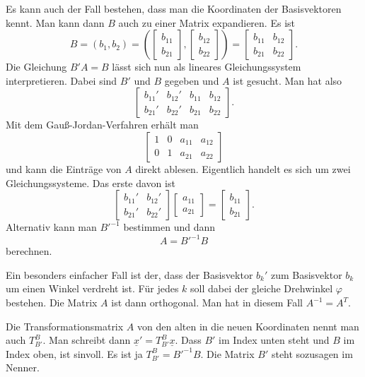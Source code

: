 \documentclass[a4paper,10pt,fleqn,twocolumn,twoside]{article}
\begin{document}
Es kann auch der Fall bestehen, dass man die Koordinaten der
Basisvektoren kennt. Man kann dann \(B\) auch zu einer Matrix
expandieren. Es ist
\[B = (b_1,b_2)
= (\begin{bmatrix}b_{11}\\ b_{21}\end{bmatrix},
\begin{bmatrix}b_{12}\\ b_{22}\end{bmatrix})
= \begin{bmatrix}
b_{11} & b_{12}\\
b_{21} & b_{22}
\end{bmatrix}.\]
Die Gleichung \(B'A=B\) lässt sich nun als lineares Gleichungssystem
interpretieren. Dabei sind \(B'\) und \(B\) gegeben und \(A\) ist
gesucht. Man hat also
\[\left[\begin{array}{cc|cc}
b_{11}' & b_{12}' & b_{11} & b_{12}\\
b_{21}' & b_{22}' & b_{21} & b_{22}
\end{array}\right].\]
Mit dem Gauß-Jordan-Verfahren erhält man
\[\left[\begin{array}{cc|cc}
1 & 0 & a_{11} & a_{12}\\
0 & 1 & a_{21} & a_{22}
\end{array}\right]\]
und kann die Einträge von \(A\) direkt ablesen.
Eigentlich handelt es sich um zwei Gleichungssysteme.
Das erste davon ist
\[\begin{bmatrix}
b_{11}' & b_{12}'\\
b_{21}' & b_{22}'
\end{bmatrix}
\begin{bmatrix}
a_{11}\\ a_{21}
\end{bmatrix}
= \begin{bmatrix}
b_{11}\\ b_{21}
\end{bmatrix}.\]
Alternativ kann man \(B'^{-1}\) bestimmen und dann
\[A = B'^{-1}B\]
berechnen.

Ein besonders einfacher Fall ist der, dass der Basisvektor \(b_k'\)
zum Basisvektor \(b_k\) um einen Winkel verdreht ist. Für jedes \(k\)
soll dabei der gleiche Drehwinkel \(\varphi\) bestehen. Die Matrix
\(A\) ist dann orthogonal. Man hat in diesem Fall \(A^{-1}=A^T\). 

Die Transformationsmatrix \(A\) von den
alten in die neuen Koordinaten nennt man auch \(T_{B'}^B\).
Man schreibt dann \(\underline x'=T_{B'}^B\underline x\).
Dass \(B'\) im Index unten steht und \(B\) im Index oben, ist sinvoll.
Es ist ja \(T_{B'}^B=B'^{-1}B\). Die Matrix \(B'\) steht sozusagen
im Nenner.
\end{document}
